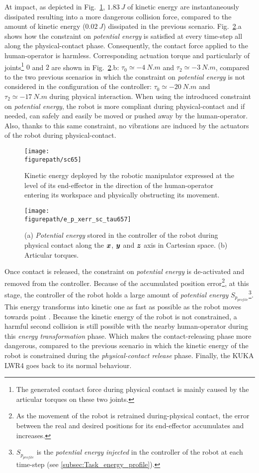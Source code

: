 At impact, as depicted in Fig.~\ref{fig:sc65}, $1.83~J$ of kinetic energy are instantaneously dissipated resulting into a more dangerous collision force, compared to the amount of kinetic energy ($0.02~J$) dissipated in the previous scenario. 
Fig.~\ref{fig:e_p_xerr_sc_tau657}.a shows how the constraint on \textit{potential energy} is satisfied at every time-step all along the physical-contact phase. Consequently, the contact force applied to the human-operator is harmless. Corresponding actuation torque and particularly of joints\footnote{The generated contact force during physical contact is mainly caused by the articular torques on these two joints.} $0$ and $2$ are shown in Fig.~\ref{fig:e_p_xerr_sc_tau657}.b: $\tau_0 \simeq -4~N.m$ and $\tau_2  \simeq -3~N.m$, compared to the two previous scenarios in which the constraint on \textit{potential energy} is not considered in the configuration of the controller: $\tau_0 \simeq -20~N.m$ and $\tau_2 \simeq -17~N.m$ during physical interaction. When using the introduced constraint on \textit{potential energy}, the robot is more compliant during physical-contact and if needed, can safely and easily be moved or pushed away by the human-operator. Also, thanks to this same constraint, no vibrations are induced by the actuators of the robot during physical-contact. 
\begin{figure}[!ht]
\centering
\captionsetup{width=0.99\linewidth}\texttt{[image: \\figurepath/sc65]}
\caption{Kinetic energy deployed by the robotic manipulator expressed at the level of its end-effector in the direction of the human-operator entering its workspace and physically obstructing its movement.}
\label{fig:sc65}
\end{figure}
\begin{figure}[!ht]
\centering
\captionsetup{width=.99\linewidth}\texttt{[image: \\figurepath/e\_p\_xerr\_sc\_tau657]}
\caption{(a) \textit{Potential energy} stored in the controller of the robot during physical contact along the $\mbox{\boldmath${x}$}$, $\mbox{\boldmath${y}$}$ and $\mbox{\boldmath${z}$}$ axis in Cartesian space. (b) Articular torques.}
\label{fig:e_p_xerr_sc_tau657}
\end{figure}
Once contact is released, the constraint on \textit{potential energy} is de-activated and removed from the controller. Because of the accumulated position error\footnote{As the movement of the robot is retrained during-physical contact, the error between the real and desired positions for its end-effector accumulates and increases.}, at this stage, the controller of the robot holds a large amount of \textit{potential energy} $S_{p_{profile}}$\footnote{$S_{p_{profile}}$ is the \textit{potential energy} \textit{injected} in the controller of the robot at each time-step (see \ref{subsec:Task_energy_profile}).}. This energy transforms into kinetic one as fast as possible as the robot moves towards point . Because the  kinetic energy of the robot is not constrained, a harmful second collision is still possible with the nearby human-operator during this \textit{energy transformation} phase. Which makes the contact-releasing phase more dangerous, compared to the previous scenario in which the kinetic energy of the robot is constrained during the \textit{physical-contact release} phase. Finally, the KUKA LWR4 goes back to its normal behaviour.
